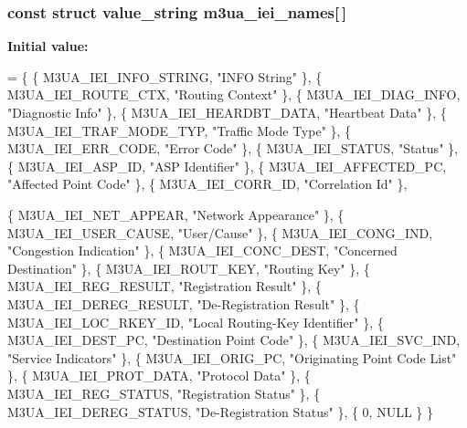 \subsubsection[{m3ua\+\_\+iei\+\_\+names}]{\setlength{\rightskip}{0pt plus 5cm}const struct value\+\_\+string m3ua\+\_\+iei\+\_\+names[$\,$]\hspace{0.3cm}{\ttfamily [static]}}\label{m3ua_8c_ae8a54d2c40aa1006643f73c16d66f8af}
{\bfseries Initial value\+:}
\begin{DoxyCode}
= \{
        \{ M3UA_IEI_INFO_STRING,         \textcolor{stringliteral}{"INFO String"} \},
        \{ M3UA_IEI_ROUTE_CTX,           \textcolor{stringliteral}{"Routing Context"} \},
        \{ M3UA_IEI_DIAG_INFO,           \textcolor{stringliteral}{"Diagnostic Info"} \},
        \{ M3UA_IEI_HEARDBT_DATA,        \textcolor{stringliteral}{"Heartbeat Data"} \},
        \{ M3UA_IEI_TRAF_MODE_TYP,       \textcolor{stringliteral}{"Traffic Mode Type"} \},
        \{ M3UA_IEI_ERR_CODE,            \textcolor{stringliteral}{"Error Code"} \},
        \{ M3UA_IEI_STATUS,              \textcolor{stringliteral}{"Status"} \},
        \{ M3UA_IEI_ASP_ID,              \textcolor{stringliteral}{"ASP Identifier"} \},
        \{ M3UA_IEI_AFFECTED_PC,         \textcolor{stringliteral}{"Affected Point Code"} \},
        \{ M3UA_IEI_CORR_ID,             \textcolor{stringliteral}{"Correlation Id"} \},

        \{ M3UA_IEI_NET_APPEAR,          \textcolor{stringliteral}{"Network Appearance"} \},
        \{ M3UA_IEI_USER_CAUSE,          \textcolor{stringliteral}{"User/Cause"} \},
        \{ M3UA_IEI_CONG_IND,            \textcolor{stringliteral}{"Congestion Indication"} \},
        \{ M3UA_IEI_CONC_DEST,           \textcolor{stringliteral}{"Concerned Destination"} \},
        \{ M3UA_IEI_ROUT_KEY,            \textcolor{stringliteral}{"Routing Key"} \},
        \{ M3UA_IEI_REG_RESULT,          \textcolor{stringliteral}{"Registration Result"} \},
        \{ M3UA_IEI_DEREG_RESULT,        \textcolor{stringliteral}{"De-Registration Result"} \},
        \{ M3UA_IEI_LOC_RKEY_ID,         \textcolor{stringliteral}{"Local Routing-Key Identifier"} \},
        \{ M3UA_IEI_DEST_PC,             \textcolor{stringliteral}{"Destination Point Code"} \},
        \{ M3UA_IEI_SVC_IND,             \textcolor{stringliteral}{"Service Indicators"} \},
        \{ M3UA_IEI_ORIG_PC,             \textcolor{stringliteral}{"Originating Point Code List"} \},
        \{ M3UA_IEI_PROT_DATA,           \textcolor{stringliteral}{"Protocol Data"} \},
        \{ M3UA_IEI_REG_STATUS,          \textcolor{stringliteral}{"Registration Status"} \},
        \{ M3UA_IEI_DEREG_STATUS,        \textcolor{stringliteral}{"De-Registration Status"} \},
        \{ 0, NULL \}
\}
\end{DoxyCode}
